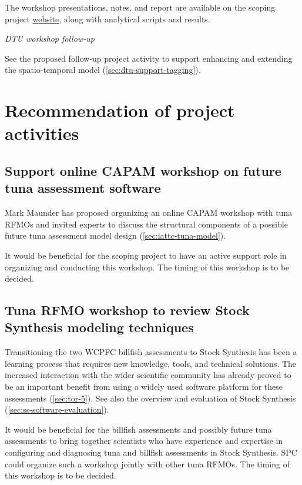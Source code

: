 \documentclass{SCreport}
\newcommand\tree
{https://github.com/PacificCommunity/ofp-sam-transition-plan/tree/main}
\begin{document}
The workshop presentations, notes, and report are available on the scoping
project \href{\tree/workshops/2025-05-copenhagen}{website}, along with
analytical scripts and results.

\vspace{2ex}

\textit{DTU workshop follow-up}

See the proposed follow-up project activity to support enhancing and extending
the spatio-temporal model (\autoref{sec:dtu-support-tagging}).

\vspace{2ex}

\section{Recommendation of project activities}

\subsection{Support online CAPAM workshop on future tuna assessment software}
\label{sec:capam-online-workshop}

Mark Maunder has proposed organizing an online CAPAM workshop with tuna RFMOs
and invited experts to discuss the structural components of a possible future
tuna assessment model design (\autoref{sec:iattc-tuna-model}).

It would be beneficial for the scoping project to have an active support role in
organizing and conducting this workshop. The timing of this workshop is to be
decided.

\vspace{2ex}

\subsection{Tuna RFMO workshop to review Stock Synthesis modeling techniques}
\label{sec:ss-modeling-techniques}

Transitioning the two WCPFC billfish assessments to Stock Synthesis has been a
learning process that requires new knowledge, tools, and technical solutions.
The increased interaction with the wider scientific community has already proved
to be an important benefit from using a widely used software platform for these
assessments (\autoref{sec:tor-5}). See also the overview and evaluation of Stock
Synthesis (\autoref{sec:ss-software-evaluation}).

It would be beneficial for the billfish assessments and possibly future tuna
assessments to bring together scientists who have experience and expertise in
configuring and diagnosing tuna and billfish assessments in Stock Synthesis. SPC
could organize such a workshop jointly with other tuna RFMOs. The timing of this
workshop is to be decided.
\end{document}
